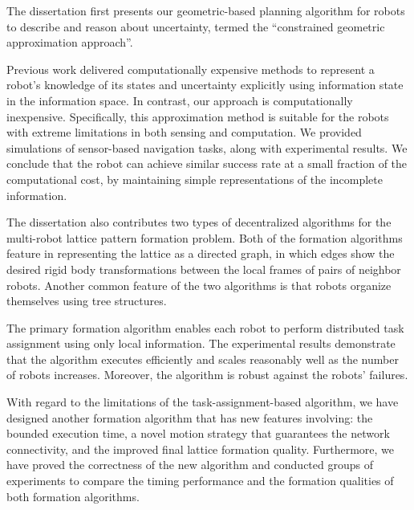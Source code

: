 The dissertation first presents our geometric-based planning algorithm
for robots to describe and reason about
uncertainty, termed the ``constrained geometric approximation approach''.

Previous work delivered computationally expensive methods to represent a robot's
knowledge of its states and uncertainty explicitly using information state in
the information space. 
%
In contrast, our approach is computationally inexpensive.
Specifically, this approximation method is suitable for the robots 
with extreme limitations in both sensing and computation. 
%
We provided simulations of sensor-based navigation
tasks, along with experimental results.
%
We conclude that the robot can achieve similar success rate at a small fraction of the computational cost,
by maintaining simple representations of the incomplete information.
  
The dissertation also contributes two types of decentralized algorithms for the multi-robot
lattice pattern formation problem. 
%
Both of the formation algorithms feature in representing the lattice as
a directed graph, in which edges show the desired rigid body transformations
between the local frames of pairs of neighbor robots. 
%
Another common feature of the two algorithms is that robots organize themselves using tree structures. 

The primary formation algorithm enables each robot to perform distributed task assignment using
only local information.
%
The experimental results demonstrate that the algorithm executes efficiently and 
scales reasonably well as the number of robots increases.
Moreover, the algorithm is robust against the robots' failures.


With regard to the limitations of the task-assignment-based algorithm, 
we have designed another formation algorithm that has new features involving:
the bounded execution time, a novel motion strategy that guarantees the network connectivity, 
and the improved final lattice formation quality.
%
Furthermore, we have proved the correctness of the new algorithm and 
conducted groups of experiments to compare the timing performance 
and the formation qualities of both formation algorithms.
